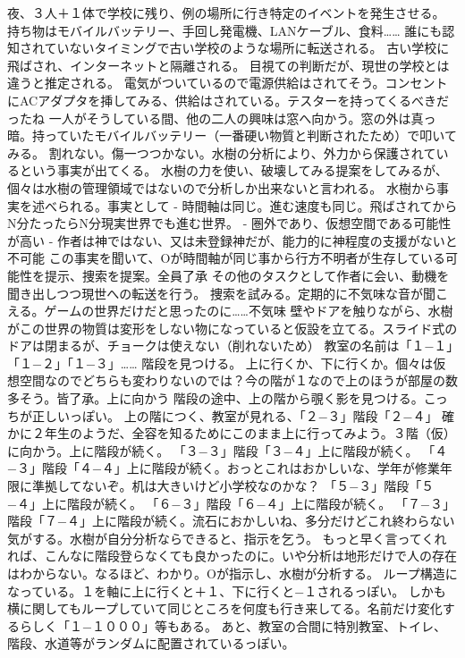 \documentclass[uplatex]{utbook}
\begin{document}
夜、３人＋１体で学校に残り、例の場所に行き特定のイベントを発生させる。
持ち物はモバイルバッテリー、手回し発電機、LANケーブル、食料……
誰にも認知されていないタイミングで古い学校のような場所に転送される。
古い学校に飛ばされ、インターネットと隔離される。
目視ての判断だが、現世の学校とは違うと推定される。
電気がついているので電源供給はされてそう。コンセントにACアダプタを挿してみる、供給はされている。テスターを持ってくるべきだったね
一人がそうしている間、他の二人の興味は窓へ向かう。窓の外は真っ暗。持っていたモバイルバッテリー（一番硬い物質と判断されたため）で叩いてみる。
割れない。傷一つつかない。水樹の分析により、外力から保護されているという事実が出てくる。
水樹の力を使い、破壊してみる提案をしてみるが、個々は水樹の管理領域ではないので分析しか出来ないと言われる。
水樹から事実を述べられる。事実として
- 時間軸は同じ。進む速度も同じ。飛ばされてからN分たったらN分現実世界でも進む世界。
- 圏外であり、仮想空間である可能性が高い
- 作者は神ではない、又は未登録神だが、能力的に神程度の支援がないと不可能
この事実を聞いて、Oが時間軸が同じ事から行方不明者が生存している可能性を提示、捜索を提案。全員了承
その他のタスクとして作者に会い、動機を聞き出しつつ現世への転送を行う。
捜索を試みる。定期的に不気味な音が聞こえる。ゲームの世界だけだと思ったのに……不気味
壁やドアを触りながら、水樹がこの世界の物質は変形をしない物になっていると仮設を立てる。スライド式のドアは閉まるが、チョークは使えない（削れないため）
教室の名前は「１−１」「１−２」「１−３」……
階段を見つける。
上に行くか、下に行くか。個々は仮想空間なのでどちらも変わりないのでは？今の階が１なので上のほうが部屋の数多そう。皆了承。上に向かう
階段の途中、上の階から覗く影を見つける。こっちが正しいっぽい。
上の階につく、教室が見れる、「２−３」階段「２−４」
確かに２年生のようだ、全容を知るためにこのまま上に行ってみよう。３階（仮）に向かう。上に階段が続く。
「３−３」階段「３−４」上に階段が続く。
「４−３」階段「４−４」上に階段が続く。おっとこれはおかしいな、学年が修業年限に準拠してないぞ。机は大きいけど小学校なのかな？
「５−３」階段「５−４」上に階段が続く。
「６−３」階段「６−４」上に階段が続く。
「７−３」階段「７−４」上に階段が続く。流石におかしいね、多分だけどこれ終わらない気がする。水樹が自分分析ならできると、指示を乞う。
もっと早く言ってくれれば、こんなに階段登らなくても良かったのに。いや分析は地形だけで人の存在はわからない。なるほど、わかり。Oが指示し、水樹が分析する。
ループ構造になっている。１を軸に上に行くと＋１、下に行くと−１されるっぽい。
しかも横に関してもループしていて同じところを何度も行き来してる。名前だけ変化するらしく「１−１０００」等もある。
あと、教室の合間に特別教室、トイレ、階段、水道等がランダムに配置されているっぽい。
\end{document}
